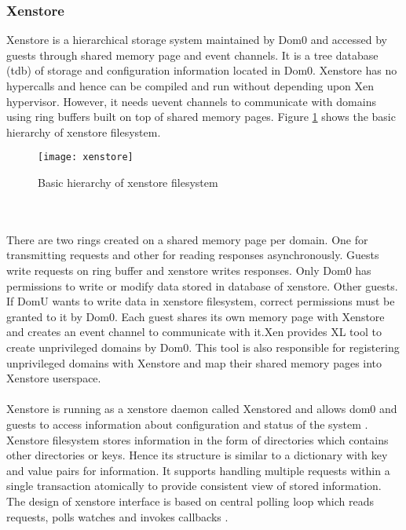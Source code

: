 \subsubsection{Xenstore \label{sec:xenstore}}
Xenstore is a hierarchical storage system maintained by Dom0 and accessed by guests through shared memory page and event channels. It is a tree database (tdb) of storage and configuration information located in Dom0. Xenstore has no hypercalls and hence can be compiled and run without depending upon Xen hypervisor. However, it needs uevent channels to communicate with domains using ring buffers built on top of shared memory pages. Figure \ref{xenstore} shows the basic hierarchy of xenstore filesystem.
\begin{figure}[!htbp]
	\centering
	\texttt{[image: xenstore]}
	\caption{Basic hierarchy of xenstore filesystem}
	\label{xenstore}
\end{figure}
\\
\\
There are two rings created on a shared memory page per domain. One for transmitting requests and other for reading responses asynchronously. Guests write requests on ring buffer and xenstore writes responses. Only Dom0 has permissions to write or modify data stored in database of xenstore. Other guests. If DomU wants to write data in xenstore filesystem, correct permissions must be granted to it by Dom0. Each guest shares its own memory page with Xenstore  and creates an event channel to communicate with it.Xen provides XL tool \cite{xl} to create unprivileged domains by Dom0. This tool is also responsible for registering unprivileged domains with Xenstore and map their shared memory pages into Xenstore userspace.
\\
\\
Xenstore is running as a xenstore daemon called Xenstored and allows dom0 and guests to access information about configuration and status of the system \cite{xenstore}. Xenstore filesystem stores information in the form of directories which contains other directories or keys. Hence its structure is similar to a dictionary with key and value pairs for information. It supports handling multiple requests within a single transaction atomically to provide consistent view of stored information. The design of xenstore interface is based on central polling loop which reads requests, polls watches and invokes callbacks \cite{xenstore_ref}.

